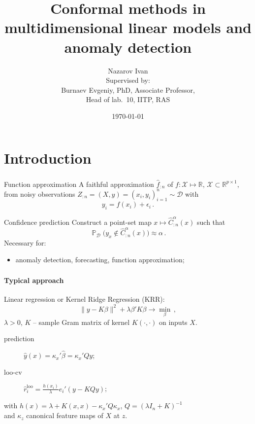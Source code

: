 \documentclass[t]{beamer}  %
\title{Conformal methods in multidimensional linear models and anomaly detection}
\author[Nazarov I.]{\small Nazarov Ivan\\
{\smaller \vspace{\baselineskip}
Supervised by:\\
Burnaev Evgeniy, PhD,
Associate Professor,\\
Head of lab.~10, IITP, RAS}}
\date{\today}
\institute[Higher School of Economics]{National Research University \\ Higher School of Economics}
\newcommand{\Dcal}{\mathcal{D}}
\newcommand{\Xcal}{\mathcal{X}}
\newcommand{\Real}{\mathbb{R}}
\newcommand{\pr}{\mathop{\mathbb{P}}\nolimits}
\begin{document}
\frame[plain]{\titlepage} %

\section{Introduction} %
\label{sec:introduction}

\begin{frame}[c]\frametitle{\insertsection}
  \begin{block}{Function approximation}
    A faithful approximation $\hat{f}_{:n}$ of $f:\Xcal \mapsto \Real$,
    $\Xcal\subset \Real^{p\times 1}$, from noisy observations
    $Z_{:n} = (X,y) = (x_i, y_i)_{i=1}^n \sim \Dcal$ with
    $$ y_i = f(x_i) + \epsilon_i \,. $$
  \end{block}
  \begin{block}{Confidence prediction}
    Construct a point-set map $x \mapsto \hat{C}_{:n}^\alpha(x)$ such that
    $$ \pr_\Dcal\bigl(y_x \notin \hat{C}_{:n}^\alpha(x)\bigr) \approx \alpha \,. $$
    Necessary for: \begin{itemize}
      \item anomaly detection, forecasting, function approximation;
    \end{itemize}
  \end{block}
\end{frame}

\begin{frame}[c]\frametitle{\insertsection}
  \framesubtitle{Typical approach}
  Linear regression or Kernel Ridge Regression (KRR):
  $$ \|y - K\beta \|^2 + \lambda \beta' K \beta \to \min_\beta \,, $$
  $\lambda > 0$, $K$ -- sample Gram matrix of kernel $K(\cdot,\cdot)$ on inputs $X$.
  \vspace{\baselineskip}
  \begin{description}
    \item[prediction] $\hat{y}(x) = \kappa_x' \hat{\beta} = \kappa_x' Q y$;
    \item[loo-cv] $\hat{r}^{\text{loo}}_i = \frac{h(x_i)}{\lambda} e_i'(y - K Q y)$;
  \end{description}
  with $h(x) = \lambda + K(x,x) - \kappa_x' Q \kappa_x$, $Q = (\lambda I_n + K)^{-1}$
  \hfill\\ and $\kappa_z$ canonical feature maps of $X$ at $z$.
\end{frame}
\end{document}
